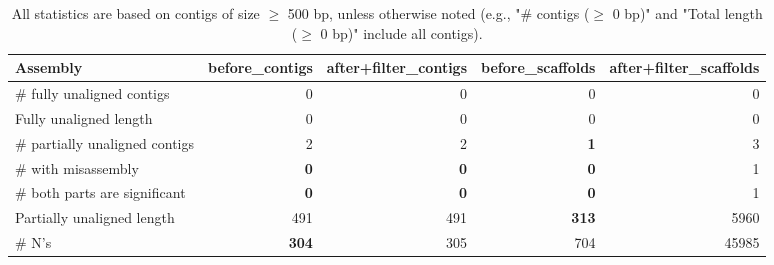 \documentclass[12pt,a4paper]{article}
\begin{document}
\begin{table}[ht]
\begin{center}
\caption{All statistics are based on contigs of size $\geq$ 500 bp, unless otherwise noted (e.g., "\# contigs ($\geq$ 0 bp)" and "Total length ($\geq$ 0 bp)" include all contigs).}
\begin{tabular}{|l*{4}{|r}|}
\hline
Assembly & before\_contigs & after+filter\_contigs & before\_scaffolds & after+filter\_scaffolds \\ \hline
\# fully unaligned contigs & 0 & 0 & 0 & 0 \\ \hline
Fully unaligned length & 0 & 0 & 0 & 0 \\ \hline
\# partially unaligned contigs & 2 & 2 & {\bf 1} & 3 \\ \hline
\hspace{5mm}\# with misassembly & {\bf 0} & {\bf 0} & {\bf 0} & 1 \\ \hline
\hspace{5mm}\# both parts are significant & {\bf 0} & {\bf 0} & {\bf 0} & 1 \\ \hline
Partially unaligned length & 491 & 491 & {\bf 313} & 5960 \\ \hline
\# N's & {\bf 304} & 305 & 704 & 45985 \\ \hline
\end{tabular}
\end{center}
\end{table}
\end{document}
